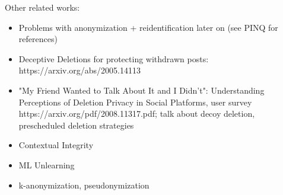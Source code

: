 Other related works:
\begin{itemize}
    \item Problems with anonymization + reidentification later on (see PINQ for references)
    \item Deceptive Deletions for protecting withdrawn posts: https://arxiv.org/abs/2005.14113
    \item "My Friend Wanted to Talk About It and I Didn't": Understanding Perceptions of
        Deletion Privacy in Social Platforms, user survey https://arxiv.org/pdf/2008.11317.pdf;
        talk about decoy deletion, prescheduled deletion strategies~\cite{myfw}
    \item Contextual Integrity
    \item ML Unlearning
    \item k-anonymization, pseudonymization
\end{itemize}
